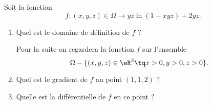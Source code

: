 
\begin{exercice}\label{exoexamens-0002}

    Soit la fonction 
    \begin{equation}
        f\colon (x,y,z)\in \Omega\to yz\ln(1-xyz)+2yz.
    \end{equation}
    \begin{enumerate}
        \item
            Quel est le domaine de définition de \( f\) ?

            Pour la suite on regardera la fonction \( f\) sur l'ensemble
            \begin{equation}
                \Omega-\{ (x,y,z)\in \eR^3\tq x>0,y>0,z>0 \}.
            \end{equation}
            
        \item
            Quel est le gradient de \( f\) au point \( (1,1,2)\) ?
        \item
            Quelle est la différentielle de \( f\) en ce point ?
    \end{enumerate}

\end{exercice}
